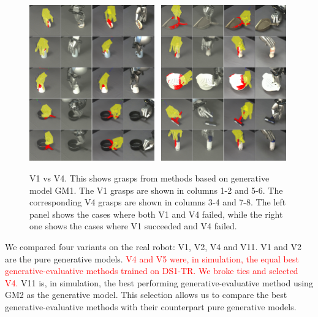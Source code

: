 \begin{figure}
\begin{center}
\includegraphics[width=0.48\textwidth]{plots/A2fA9f_vertical.png}~
\includegraphics[width=0.48\textwidth]{plots/A2sA9f_vertical.png}
\caption{V1 vs V4. This shows grasps from methods based on generative model GM1. The V1 grasps are shown in columns 1-2 and 5-6. The corresponding V4 grasps are shown in columns 3-4 and 7-8. The left panel shows the cases where both V1 and V4 failed, while the right one shows the cases where V1 succeeded and V4 failed. \label{fig:v1fsv4f}}
\end{center}
\end{figure}

We compared four variants on the real robot: V1, V2, V4 and V11. V1 and V2 are the pure generative models. \textcolor{red}{V4 and V5 were, in simulation, the equal best generative-evaluative methods trained on DS1-TR. We broke ties and selected V4.} V11 is, in simulation, the best performing generative-evaluative method using GM2 as the generative model. This selection allows us to compare the best generative-evaluative methods with their counterpart pure generative models. 


